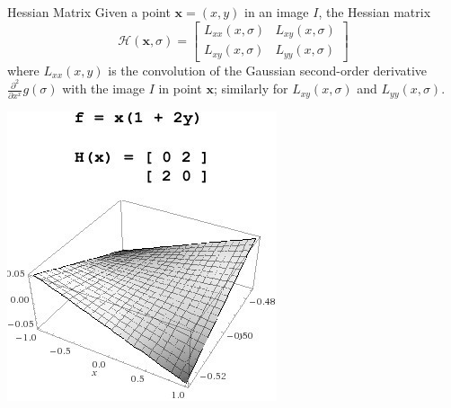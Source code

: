 \documentclass[xcolor=dvipsnames]{beamer}
\begin{document}
\begin{frame}[label=math-hessian]{Hessian Matrix}
Given a point $\mathbf{x} = (x,y)$ in an image $I$, the Hessian matrix 
\begin{equation}
\mathcal{H}(\mathbf{x}, \sigma) =
 \begin{bmatrix}
  L_{xx}(x,\sigma) &
  L_{xy}(x,\sigma) \\
  L_{xy}(x,\sigma) &
  L_{yy}(x,\sigma) 
 \end{bmatrix}
\end{equation}
where $L_{xx}(x,y)$ is the convolution of the Gaussian second-order derivative 
$\frac{\partial^2}{\partial x^x}g(\sigma)$ with the image $I$ in point $\mathbf{x}$; similarly for 
  $L_{xy}(x,\sigma)$ and
  $L_{yy}(x,\sigma)$.
\end{frame}

\begin{frame}
\begin{center}
\includegraphics[width=.7\textwidth]{imgs/hessian.jpg}
\end{center}
\end{frame}
\end{document}
